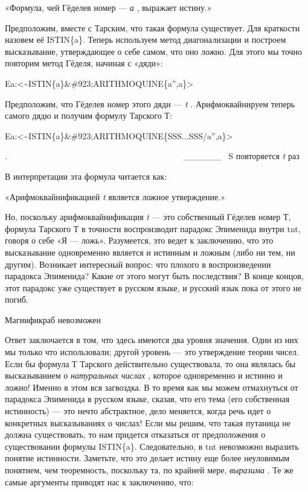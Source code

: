 \documentclass[../main.tex]{subfiles}
\begin{document}
«Формула, чей Гёделев номер --- \emph{а} , выражает истину.»

Предположим, вместе с Тарским, что такая формула существует. Для краткости назовем её ISTIN\{a\}. Теперь используем метод диагонализации и построем высказывание, утверждающее о себе самом, что оно ложно. Для этого мы точно повторим метод Гёделя, начиная с «дяди»:

Ea:\textless\textasciitilde ISTIN\{a\}\&\#923;ARITHMOQUINE\{a'',a\}\textgreater{}

Предположим, что Гёделев номер этого дяди --- \emph{t} . Арифмоквайнируем теперь самого дядю и получим формулу Тарского Т:

Ea:\textless\textasciitilde ISTIN\{a\}\&\#923;ARITHMOQUINE\{SSS...SSS/a'',a\}\textgreater{}

.~~~~~~~~~~~~~~~~~~~~~~~~~~~~~~~~~~~~~~~~~ \textbar\_\_\_\_\_\_\textbar~ S повторяется \emph{t} раз

В интерпретации эта формула читается как:

«Арифмоквайнификацией \emph{t} является ложное утверждение.»

Но, поскольку арифмоквайнификация \emph{t} --- это собственный Гёделев номер Т, формула Тарского Т в точности воспроизводит парадокс Эпименида внутри \acs{tnt}, говоря о себе «Я --- ложь». Разумеется, это ведет к заключению, что это высказывание одновременно является и истинным и ложным (либо ни тем, ни другим). Возникает интересный вопрос: что плохого в воспроизведении парадокса Эпименида? Какие от этого могут быть последствия? В конце концов, этот парадокс уже существует в русском языке, и русский язык пока от этого не погиб.

Магиификраб невозможен

Ответ заключается в том, что здесь имеются два уровня значения. Один из них мы только что использовали; другой уровень --- это утверждение теории чисел. Если бы формула Т Тарского действительно существовала, то она являлась бы высказыванием о \emph{натуральных числах} , которое одновременно и истинно и ложно! Именно в этом вся загвоздка. В то время как мы можем отмахнуться от парадокса Эпименида в русском языке, сказав, что его тема (его собственная истинность) --- это нечто абстрактное, дело меняется, когда речь идет о конкретных высказываниях о числах! Если мы решим, что такая путаница не должна существовать, то нам придется отказаться от предположения о существовании формулы ISTIN\{a\}. Следовательно, в \acs{tnt} невозможно выразить понятие истинности. Заметьте, что это делает истину еще более неуловимым понятием, чем теоремность, поскольку та, по крайней мере, \emph{выразима} . Те же самые аргументы приводят нас к заключению, что:
\end{document}

